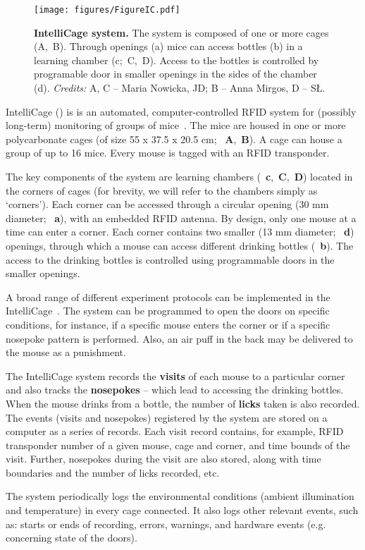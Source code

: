 
\begin{figure*}
  \texttt{[image: figures/FigureIC.pdf]}
  \caption{
    {\bf IntelliCage system.} 
    The system is composed of one or more cages (A,~B).
    Through openings (a) mice can access bottles (b) in a learning chamber (c;~C,~D).
    Access to the bottles is controlled by programable door in smaller openings in the sides
    of the chamber (d). \emph{Credits:} A, C -- Maria Nowicka, JD; B -- Anna Mirgos, D -- SŁ.
  }
  \label{intellicageSystem}
\end{figure*}

IntelliCage () is is an automated, computer-controlled RFID system for
(possibly long-term) monitoring of groups of
mice~\cite{Galsworthy:2005br,Krackow:2010ck,Puscian:2014cu}. The mice are housed in 
one or more polycarbonate cages (of size 55 x 37.5 x 20.5 cm;
~\textbf{A},~\textbf{B}). A cage can house a group of up to
16 mice. Every mouse is tagged with an RFID transponder.

The key components of the system are learning chambers
(~\textbf{c},~\textbf{C},~\textbf{D}) 
located in the corners of cages
(for brevity, we will refer to the chambers simply as `corners'). Each
corner can be accessed through a circular opening (30 mm diameter; ~\textbf{a}),
with an embedded RFID antenna. By design, only one mouse at a time can enter
a corner. Each corner contains two smaller (13 mm diameter; ~\textbf{d}) openings,
through which a mouse can access different drinking bottles (~\textbf{b}). The access to the
drinking bottles is controlled using programmable doors in
the smaller openings.


A broad range of different experiment protocols can be implemented in the
IntelliCage~\cite{Knapska:2006cz,Kiryk:2011tk,Endo:2011bs,Radwanska:2012fd,Knapska:2013dj,Smutek:2014da,Puscian:2014cu,Vannoni:2014jt}.
The system can be programmed to open the doors on specific conditions, for
instance, if a specific mouse enters the corner or if a specific nosepoke
pattern is performed. Also, an air puff in the back may be delivered to the
mouse as a punishment.

The IntelliCage system records the \textbf{visits} of
each mouse to a particular corner and also tracks the \textbf{nosepokes}
-- which lead to accessing the drinking bottles. When the mouse drinks
from a bottle, the number of \textbf{licks} taken is also recorded.
The events (visits and nosepokes) registered by the system are stored on a
computer as a series of records. Each visit record contains, for example,
RFID transponder number of a given mouse, cage and corner,
and time bounds of the visit. Further,
nosepokes during the visit are also stored, along with
time boundaries and the number of licks recorded, etc.

The system periodically logs the environmental conditions (ambient
illumination and temperature) in every cage connected. It also logs other
relevant events, such as: starts or ends of recording, errors, warnings, and
hardware events (e.g. concerning state of the doors).
